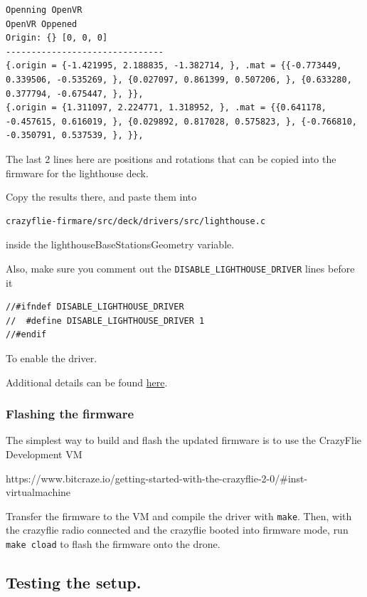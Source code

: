 \begin{verbatim}
Openning OpenVR
OpenVR Oppened
Origin: {} [0, 0, 0]
-------------------------------
{.origin = {-1.421995, 2.188835, -1.382714, }, .mat = {{-0.773449, 0.339506, -0.535269, }, {0.027097, 0.861399, 0.507206, }, {0.633280, 0.377794, -0.675447, }, }},
{.origin = {1.311097, 2.224771, 1.318952, }, .mat = {{0.641178, -0.457615, 0.616019, }, {0.029892, 0.817028, 0.575823, }, {-0.766810, -0.350791, 0.537539, }, }},
\end{verbatim}

The last 2 lines here are positions and rotations that can be copied
into the firmware for the lighthouse deck.

Copy the results there, and paste them into

\begin{verbatim}
crazyflie-firmare/src/deck/drivers/src/lighthouse.c
\end{verbatim}

inside the lighthouseBaseStationsGeometry variable.

Also, make sure you comment out the \texttt{DISABLE\_LIGHTHOUSE\_DRIVER}
lines before it

\begin{verbatim}
//#ifndef DISABLE_LIGHTHOUSE_DRIVER
//  #define DISABLE_LIGHTHOUSE_DRIVER 1
//#endif
\end{verbatim}

To enable the driver.

Additional details can be found
\href{https://wiki.bitcraze.io/doc:lighthouse:setup}{here}.

\hypertarget{flashing-the-firmware}{%
\subsubsection{Flashing the firmware}\label{flashing-the-firmware}}

The simplest way to build and flash the updated firmware is to use the
CrazyFlie Development VM

https://www.bitcraze.io/getting-started-with-the-crazyflie-2-0/\#inst-virtualmachine

Transfer the firmware to the VM and compile the driver with
\texttt{make}. Then, with the crazyflie radio connected and the
crazyflie booted into firmware mode, run \texttt{make\ cload} to flash
the firmware onto the drone.

\hypertarget{testing-the-setup.}{%
\subsection{Testing the setup.}\label{testing-the-setup.}}

